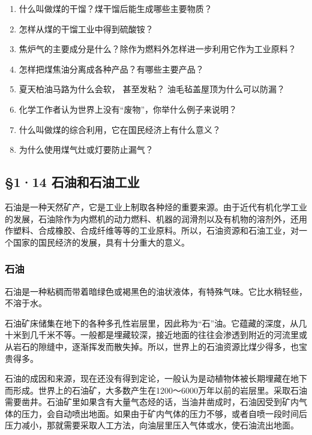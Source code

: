 \begin{enumerate}
\item
  什么叫做煤的干馏？煤干馏后能生成哪些主要物质？
\item
  怎样从煤的干馏工业中得到硫酸铵？
\item
  焦炉气的主要成分是什么？除作为燃料外怎样进一步利用它作为工业原料？
\item
  怎样把煤焦油分离成各种产品？有哪些主要产品？
\item
  夏天柏油马路为什么会软， 甚至发粘？ 油毛毡盖屋顶为什么可以防漏？
\item
  化学工作者认为世界上没有``废物''，你举什么例子来说明？
\item
  什么叫做煤的综合利用，它在国民经济上有什么意义？
\item
  为什么使用煤气灶或灯要防止漏气？
\end{enumerate}

\subsection{§1·14 石油和石油工业}

石油是一种天然矿产，它是工业上制取各种烃的重要来源。由于近代有机化学工业的发展，石油除作为内燃机的动力燃料、机器的润滑剂以及有机物的溶剂外，还用作塑料、合成橡胶、合成纤维等等的工业原料。所以，石油资源和石油工业，对一个国家的国民经济的发展，具有十分重大的意义。

\subsubsection{石油}

石油是一种粘稠而带着暗绿色或褐黑色的油状液体，有特殊气味。它比水稍轻些，不溶于水。

石油矿床储集在地下的各种多孔性岩层里，因此称为``石''油。它蕴藏的深度，从几十米到几千米不等。一般都是埋藏较深，接近地面的往往会渗透到附近的河流里或从岩石的隙缝中，逐渐挥发而散失掉。所以，世界上的石油资源比煤少得多，也宝贵得多。

石油的成因和来源，现在还没有得到定论，一般认为是动植物体被长期埋藏在地下而形成。世界上的石油矿，大多数产生在1200～6000万年以前的岩层里。采取石油需要凿井。石油矿里如果含有大量气态烃的话，当油井凿成时，石油因受到矿内气体的压力，会自动喷出地面。如果由于矿内气体的压力不够，或者自喷一段时间后压力减小，那就需要采取人工方法，向油层里压入气体或水，使石油流出地面。

